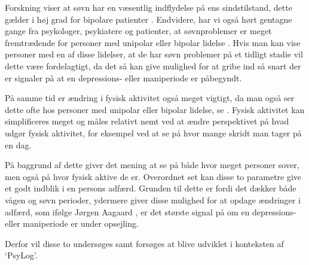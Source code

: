 Forskning viser at søvn har en væsentlig indflydelse på ens sindstilstand, dette gælder i høj grad for bipolare patienter \citep{CPSP:CPSP1164}.
Endvidere, har vi også hørt gentagne gange fra psykologer, psykiatere og patienter, at søvnproblemer er meget fremtrædende for personer med unipolar eller bipolar lidelse \citep[Kapitel 2, Sektion 3,4,5]{misc:faellesrapp}.
Hvis man kan vise personer med en af disse lidelser, at de har søvn problemer på et tidligt stadie vil dette være fordelagtigt, da det så kan give mulighed for at gribe ind så snart der er signaler på at en depressions- eller maniperiode er påbegyndt.

På samme tid er ændring i fysisk aktivitet også meget vigtigt, da man også ser dette ofte hos personer med unipolar eller bipolar lidelse, se \citep[Kapitel 1, Sektion 4]{misc:faellesrapp}. 
Fysisk aktivitet kan simplificeres meget og måles relativt nemt ved at ændre perspektivet på hvad udgør fysisk aktivitet, for eksempel ved at se på hvor mange skridt man tager på en dag.

På baggrund af dette giver det mening at se på både hvor meget personer sover, men også på hvor fysisk aktive de er.
Overordnet set kan disse to parametre give et godt indblik i en persons adfærd.
Grunden til dette er fordi det dækker både vågen og søvn perioder, ydermere giver disse mulighed for at opdage ændringer i adfærd, som ifølge Jørgen Aagaard \citep[Kapitel 1, Sektion 4]{misc:faellesrapp}, er det største signal på om en depressions- eller maniperiode er under opsejling. 

Derfor vil disse to undersøges samt forsøges at blive udviklet i konteksten af `PsyLog'.